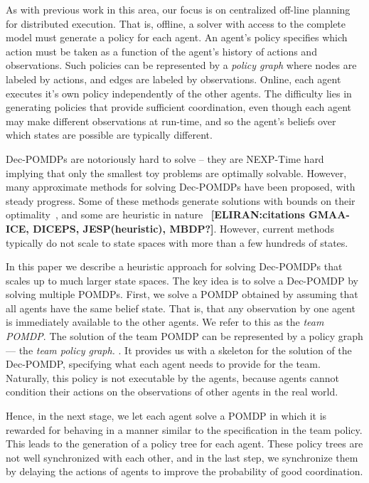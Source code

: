 \documentclass[letterpaper]{article} %
\newcommand{\eliran}[1]{\textbf{[\color{red}ELIRAN:#1]}}
\begin{document}
As with previous work in this area, our focus is on centralized off-line planning for distributed execution. That is, offline, a solver with access to the complete model must generate a policy for each agent. An agent's policy specifies which action must be taken as a function of the agent's history of
actions and observations. Such policies can be represented by a {\em policy graph} where nodes are labeled by actions, and edges are labeled by observations. Online, each agent executes it's own policy independently of the other agents.
The difficulty lies in generating policies that provide sufficient coordination, even though each agent may make different observations at run-time, and so the agent's beliefs over which states are possible are typically different. 

Dec-POMDPs are notoriously hard to solve -- they are NEXP-Time hard~\cite{} implying that only the smallest toy problems are optimally solvable.
However, many approximate methods for solving Dec-POMDPs have been proposed, with steady progress. Some of these methods generate solutions with bounds on
their optimality~\cite{}, and some are heuristic in nature~\cite{} \eliran{citations GMAA-ICE, DICEPS, JESP(heuristic), MBDP?}. However, current methods typically do not scale to state spaces with more than a few hundreds of states.


In this paper we describe a heuristic approach for solving Dec-POMDPs that scales up to much larger state spaces. The key idea is to solve a Dec-POMDP by
solving multiple POMDPs. First, we solve a POMDP obtained by assuming that all agents have the same belief state. That is, that any observation by one agent is immediately available to the other agents. We refer to this as the {\em team POMDP}. The solution of the team
POMDP can be represented by a policy graph --- the {\em team policy graph.} . It provides us with a skeleton for the solution of the Dec-POMDP, specifying what each agent needs to provide for the team. Naturally, this policy is not executable by the agents, because agents cannot condition their actions on the observations of other agents in the real world.

Hence, in the next stage, we let each agent solve a POMDP in which it is rewarded for behaving in a manner similar to the specification in the team policy. This leads to the generation of a policy tree for each agent. 
These policy trees are not well synchronized with each other, and in the last step, we synchronize them by delaying the actions of agents to
improve the probability of good coordination. 
\end{document}
